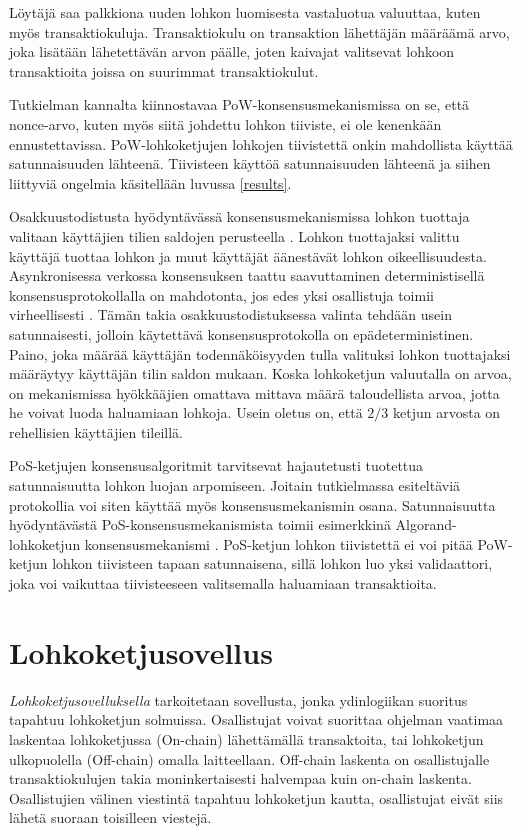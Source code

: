 Löytäjä saa palkkiona uuden lohkon luomisesta vastaluotua valuuttaa, kuten myös transaktiokuluja. Transaktiokulu on transaktion lähettäjän määräämä arvo, joka lisätään lähetettävän arvon päälle, joten kaivajat valitsevat lohkoon transaktioita joissa on suurimmat transaktiokulut.

Tutkielman kannalta kiinnostavaa PoW-konsensusmekanismissa on se, että nonce-arvo, kuten myös siitä johdettu lohkon tiiviste, ei ole kenenkään ennustettavissa. PoW-lohkoketjujen lohkojen tiivistettä onkin mahdollista käyttää satunnaisuuden lähteenä. Tiivisteen käyttöä satunnaisuuden lähteenä ja siihen liittyviä ongelmia käsitellään luvussa \ref{results}.


Osakkuustodistusta hyödyntävässä konsensusmekanismissa lohkon tuottaja valitaan käyttäjien tilien saldojen perusteella \cite{NguyenCongT2019PCMf}. Lohkon tuottajaksi valittu käyttäjä tuottaa lohkon ja muut käyttäjät äänestävät lohkon oikeellisuudesta. Asynkronisessa verkossa konsensuksen taattu saavuttaminen deterministisellä konsensusprotokollalla on mahdotonta, jos edes yksi osallistuja toimii virheellisesti \cite{fischer_impossibility_1985}. Tämän takia osakkuustodistuksessa valinta tehdään usein satunnaisesti, jolloin käytettävä konsensusprotokolla on epädeterministinen. Paino, joka määrää käyttäjän todennäköisyyden tulla valituksi lohkon tuottajaksi määräytyy käyttäjän tilin saldon mukaan. Koska lohkoketjun valuutalla on arvoa, on mekanismissa hyökkääjien omattava mittava määrä taloudellista arvoa, jotta he voivat luoda haluamiaan lohkoja. Usein oletus on, että $2/3$ ketjun arvosta on rehellisien käyttäjien tileillä. 

 PoS-ketjujen konsensusalgoritmit tarvitsevat hajautetusti tuotettua satunnaisuutta lohkon luojan arpomiseen. Joitain tutkielmassa esiteltäviä protokollia voi siten käyttää myös konsensusmekanismin osana. Satunnaisuutta hyödyntävästä PoS-konsensusmekanismista toimii esimerkkinä Algorand-lohkoketjun konsensusmekanismi \cite{gilad_algorand_2017}. PoS-ketjun lohkon tiivistettä ei voi pitää PoW-ketjun lohkon tiivisteen tapaan satunnaisena, sillä lohkon luo yksi validaattori, joka voi vaikuttaa tiivisteeseen valitsemalla haluamiaan transaktioita.

\section{Lohkoketjusovellus}

\textit{Lohkoketjusovelluksella} tarkoitetaan sovellusta, jonka ydinlogiikan suoritus tapahtuu lohkoketjun solmuissa. Osallistujat voivat suorittaa ohjelman vaatimaa laskentaa lohkoketjussa (On-chain) lähettämällä transaktoita, tai lohkoketjun ulkopuolella (Off-chain) omalla laitteellaan. Off-chain laskenta on osallistujalle transaktiokulujen takia moninkertaisesti halvempaa kuin on-chain laskenta. Osallistujien välinen viestintä tapahtuu lohkoketjun kautta, osallistujat eivät siis lähetä suoraan toisilleen viestejä.

